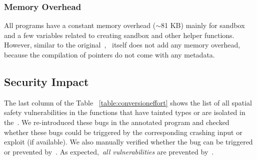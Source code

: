 \subsubsection{Memory Overhead}
All programs have a constant memory overhead ($\sim$81 KB) mainly for sandbox and a few variables related to creating sandbox and other helper functions.
However, similar to the original~\checkedc,~\systemname{} itself does not add any memory overhead,
because the compilation of  pointers do not come with any metadata.




\subsection{Security Impact}
\label{subsec:securityimpact}
The last column of the Table ~\ref{table:conversioneffort} shows the list of all spatial safety vulnerabilities in the functions that have tainted types or are isolated in the~\ucregion{}.
We re-introduced these bugs in the annotated program and checked whether these bugs could be triggered by the corresponding crashing input or exploit (if available).
We also manually verified whether the bug can be triggered or prevented by~\systemname{}.
As expected,~\emph{all vulnerabilities} are prevented by~\systemname{}.

